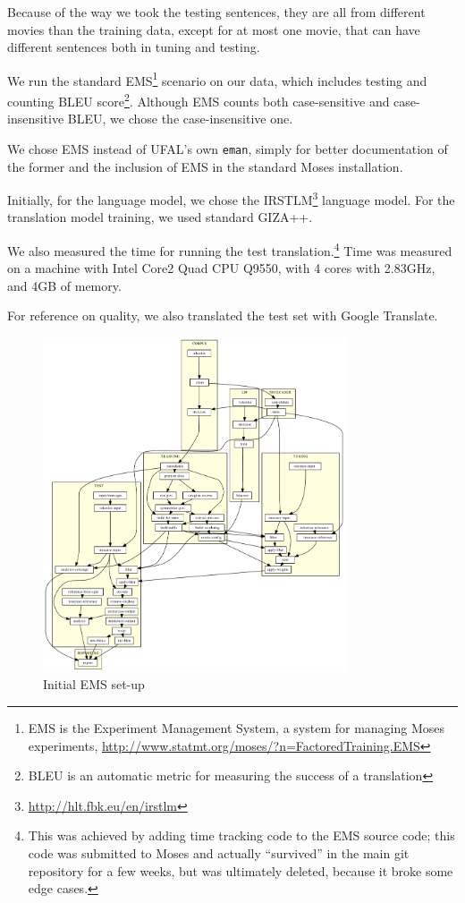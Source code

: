 Because of the way we took the testing sentences, they are all from different movies than the training data, except for at most one movie, that can have different sentences both in tuning and testing.

We run the standard EMS\footnote{EMS is the Experiment Management System, a system for managing Moses experiments, \url{http://www.statmt.org/moses/?n=FactoredTraining.EMS}} scenario on our data, which includes testing and counting BLEU score\footnote{BLEU is an automatic metric for measuring the success of a translation}. Although EMS counts both case-sensitive and case-insensitive BLEU, we chose the case-insensitive one.

We chose EMS instead of UFAL's own \texttt{eman}, simply for better documentation of the former and the inclusion of EMS in the standard Moses installation.

Initially, for the language model, we chose the IRSTLM\footnote{\url{http://hlt.fbk.eu/en/irstlm}} language model. For the translation model training, we used standard GIZA++.

We also measured the time for running the test translation.\footnote{This was achieved by adding time tracking code to the EMS source code; this code was submitted to Moses and actually ``survived'' in the main git repository for a few weeks, but was ultimately deleted, because it broke some edge cases.} Time was measured on a machine with Intel Core2 Quad CPU Q9550, with 4 cores with 2.83GHz, and 4GB of memory.

For reference on quality, we also translated the test set with Google Translate.

\begin{figure}[h]
\begin{center}
\includegraphics[width=0.8\textwidth]{figures/moses_13_graf.pdf}
\end{center}
\caption{Initial EMS set-up}\label{moses:initial}
\end{figure}

